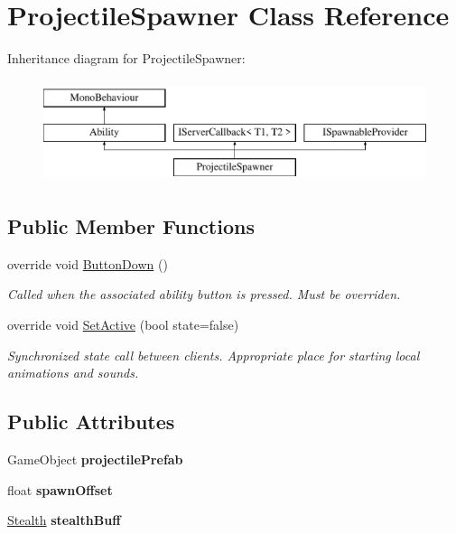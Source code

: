 \hypertarget{class_projectile_spawner}{}\section{Projectile\+Spawner Class Reference}
\label{class_projectile_spawner}
Inheritance diagram for Projectile\+Spawner\+:\begin{figure}[H]
\begin{center}
\leavevmode
\includegraphics[height=3.000000cm]{class_projectile_spawner}
\end{center}
\end{figure}
\subsection*{Public Member Functions}
\begin{DoxyCompactItemize}
\item 
override void \hyperlink{class_projectile_spawner_a9495a0da1b27877198ccd1d7f7153743}{Button\+Down} ()
\begin{DoxyCompactList}\small\item\em Called when the associated ability button is pressed. Must be overriden. \end{DoxyCompactList}\item 
override void \hyperlink{class_projectile_spawner_a9896d21e1871b84380b473e90e1c8640}{Set\+Active} (bool state=false)
\begin{DoxyCompactList}\small\item\em Synchronized state call between clients. Appropriate place for starting local animations and sounds. \end{DoxyCompactList}\end{DoxyCompactItemize}
\subsection*{Public Attributes}
\begin{DoxyCompactItemize}
\item 
\hypertarget{class_projectile_spawner_a87264233cf9333b7bc2337e4e15412e1}{}\label{class_projectile_spawner_a87264233cf9333b7bc2337e4e15412e1} 
Game\+Object {\bfseries projectile\+Prefab}
\item 
\hypertarget{class_projectile_spawner_afbcc3c39a72da8cdc78a4dda0eaa954a}{}\label{class_projectile_spawner_afbcc3c39a72da8cdc78a4dda0eaa954a} 
float {\bfseries spawn\+Offset}
\item 
\hypertarget{class_projectile_spawner_adb033d1949dc77512f096fc195cc415a}{}\label{class_projectile_spawner_adb033d1949dc77512f096fc195cc415a} 
\hyperlink{class_stealth}{Stealth} {\bfseries stealth\+Buff}
\end{DoxyCompactItemize}
